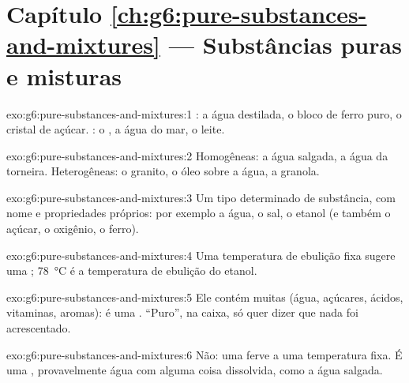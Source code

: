 \section*{Capítulo \ref{ch:g6:pure-substances-and-mixtures} --- Substâncias puras e misturas}

\begin{solution}{exo:g6:pure-substances-and-mixtures:1}
: a água destilada, o bloco de ferro puro, o cristal de
açúcar. : o , a água do mar, o leite.
\end{solution}

\begin{solution}{exo:g6:pure-substances-and-mixtures:2}
Homogêneas: a água salgada, a água da torneira. Heterogêneas: o granito,
o óleo sobre a água, a granola.
\end{solution}

\begin{solution}{exo:g6:pure-substances-and-mixtures:3}
Um tipo determinado de substância, com nome e propriedades próprios: por
exemplo a água, o sal, o etanol (e também o açúcar, o oxigênio, o ferro).
\end{solution}

\begin{solution}{exo:g6:pure-substances-and-mixtures:4}
Uma temperatura de ebulição fixa sugere uma ;
\qty{78}{\celsius} é a temperatura de ebulição do etanol.
\end{solution}

\begin{solution}{exo:g6:pure-substances-and-mixtures:5}
Ele contém muitas  (água, açúcares, ácidos, vitaminas,
aromas): é uma . ``Puro'', na caixa, só quer dizer que nada foi
acrescentado.
\end{solution}

\begin{solution}{exo:g6:pure-substances-and-mixtures:6}
Não: uma  ferve a uma temperatura fixa. É uma ,
provavelmente água com alguma coisa dissolvida, como a água salgada.
\end{solution}

